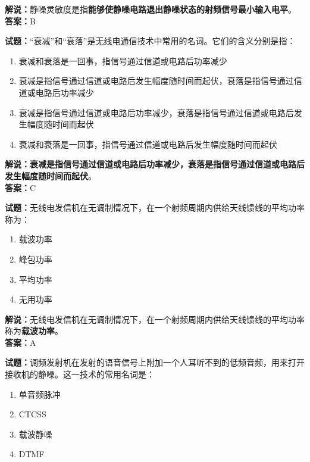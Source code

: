 \documentclass{ctexbook}
\begin{document}
\noindent\textbf{解说：}静噪灵敏度是指\textbf{能够使静噪电路退出静噪状态的射频信号最小输入电平}。\\\noindent\textbf{答案：}B%


\bigskip


\noindent\textbf{试题：}“衰减”和“衰落”是无线电通信技术中常用的名词。它们的含义分别是指：

\begin{enumerate}[leftmargin=3em]
	\item 衰减和衰落是一回事，指信号通过信道或电路后功率减少
	\item 衰减是指信号通过信道或电路后发生幅度随时间而起伏，衰落是指信号通过信道或电路后功率减少
	\item 衰减是指信号通过信道或电路后功率减少，衰落是指信号通过信道或电路后发生幅度随时间而起伏
	\item 衰减和衰落是一回事，指信号通过信道或电路后发生幅度随时间而起伏
\end{enumerate}

\noindent\textbf{解说：}\textbf{衰减是指信号通过信道或电路后功率减少，衰落是指信号通过信道或电路后发生幅度随时间而起伏}。\\\noindent\textbf{答案：}C%


\bigskip


\noindent\textbf{试题：}无线电发信机在无调制情况下，在一个射频周期内供给天线馈线的平均功率称为：

\begin{enumerate}[leftmargin=3em]
	\item 载波功率
	\item 峰包功率
	\item 平均功率
	\item 无用功率
\end{enumerate}

\noindent\textbf{解说：}无线电发信机在无调制情况下，在一个射频周期内供给天线馈线的平均功率称为\textbf{载波功率}。\\\noindent\textbf{答案：}A%


\bigskip


\noindent\textbf{试题：}调频发射机在发射的语音信号上附加一个人耳听不到的低频音频，用来打开接收机的静噪。这一技术的常用名词是：

\begin{enumerate}[leftmargin=3em]
	\item 单音频脉冲
	\item CTCSS
	\item 载波静噪
	\item DTMF
\end{enumerate}
\end{document}
